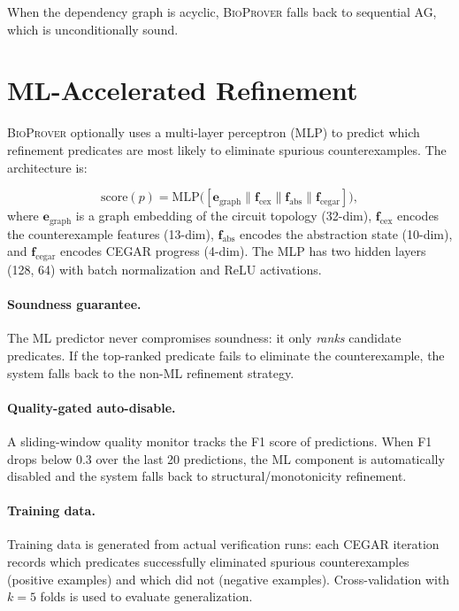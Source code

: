 \documentclass[11pt]{article}
\newcommand{\bioprover}{\textsc{BioProver}}
\newcommand{\cegar}{\textsc{CEGAR}}
\begin{document}
When the dependency graph is acyclic, \bioprover{} falls back to
sequential AG, which is unconditionally sound.

\section{ML-Accelerated Refinement}
\label{sec:ml}

\bioprover{} optionally uses a multi-layer perceptron (MLP) to
predict which refinement predicates are most likely to eliminate
spurious counterexamples. The architecture is:

\begin{equation}
  \text{score}(p) = \text{MLP}\!\big(
    [\mathbf{e}_{\text{graph}} \| \mathbf{f}_{\text{cex}} \|
     \mathbf{f}_{\text{abs}} \| \mathbf{f}_{\text{cegar}}]\big),
\end{equation}
where $\mathbf{e}_{\text{graph}}$ is a graph embedding of the circuit
topology (32-dim), $\mathbf{f}_{\text{cex}}$ encodes the
counterexample features (13-dim), $\mathbf{f}_{\text{abs}}$ encodes
the abstraction state (10-dim), and $\mathbf{f}_{\text{cegar}}$
encodes \cegar{} progress (4-dim). The MLP has two hidden layers
(128, 64) with batch normalization and ReLU activations.

\paragraph{Soundness guarantee.}
The ML predictor never compromises soundness: it only \emph{ranks}
candidate predicates. If the top-ranked predicate fails to eliminate
the counterexample, the system falls back to the non-ML refinement
strategy.

\paragraph{Quality-gated auto-disable.}
A sliding-window quality monitor tracks the F1 score of predictions.
When F1 drops below 0.3 over the last 20 predictions, the ML
component is automatically disabled and the system falls back to
structural/monotonicity refinement.

\paragraph{Training data.}
Training data is generated from actual verification runs: each
\cegar{} iteration records which predicates successfully eliminated
spurious counterexamples (positive examples) and which did not
(negative examples). Cross-validation with $k=5$ folds is used to
evaluate generalization.
\end{document}
